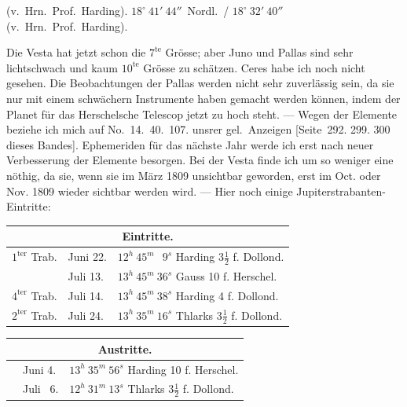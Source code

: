 \documentclass[12pt,a4paper]{book}
\begin{document}
(v.~Hrn.~Prof.~Harding). $18^{\circ}\ 41'\ 44''$~Nordl.\ / $18^{\circ}\ 32'\ 40''$ (v.~Hrn.~Prof.~Harding).

Die Vesta hat jetzt schon die $7^{\text{te}}$ Gr\"osse; aber Juno und Pallas sind sehr lichtschwach und kaum $10^{\text{te}}$ Gr\"osse zu sch\"atzen. Ceres habe ich noch nicht gesehen. Die Beobachtungen der Pallas werden nicht sehr zuverl\"assig sein, da sie nur mit einem schw\"achern Instrumente haben gemacht werden k\"onnen, indem der Planet f\"ur das Herschelsche Telescop jetzt zu hoch steht. --- Wegen der Elemente beziehe ich mich auf No.~14.~40.~107. unsrer gel.~Anzeigen [Seite~292. 299. 300 dieses Bandes]. Ephemeriden f\"ur das n\"achste Jahr werde ich erst nach neuer Verbesserung der Elemente besorgen. Bei der Vesta finde ich um so weniger eine n\"othig, da sie, wenn sie im M\"arz 1809 unsichtbar geworden, erst im Oct. oder Nov. 1809 wieder sichtbar werden wird. --- Hier noch einige Jupiterstrabanten-Eintritte:

\begin{small}
\begin{center}
\begin{tabular}{lll}
\toprule
\multicolumn{3}{c}{\textbf{Eintritte.}} \\
\midrule
$1^{\text{ter}}$ Trab. & Juni 22. & $12^{h}\ 45^{m}\ \phantom{0}9^{s}$ \quad Harding $3\frac12$ f. Dollond. \\
& Juli 13. & $13^{h}\ 45^{m}\ 36^{s}$ \quad Gauss 10 f. Herschel. \\
$4^{\text{ter}}$ Trab. & Juli 14. & $13^{h}\ 45^{m}\ 38^{s}$ \quad Harding 4 f. Dollond. \\
$2^{\text{ter}}$ Trab. & Juli 24. & $13^{h}\ 35^{m}\ 16^{s}$ \quad Thlarks $3\frac12$ f. Dollond. \\
\bottomrule
\end{tabular}
\end{center}
\end{small}

\begin{small}
\begin{center}
\begin{tabular}{lll}
\toprule
\multicolumn{3}{c}{\textbf{Austritte.}} \\
\midrule
& Juni 4. & $13^{h}\ 35^{m}\ 56^{s}$ \quad Harding 10 f. Herschel. \\
& Juli ~6. & $12^{h}\ 31^{m}\ 13^{s}$ \quad Thlarks $3\frac12$ f. Dollond. \\
\bottomrule
\end{tabular}
\end{center}
\end{small}
\end{document}

